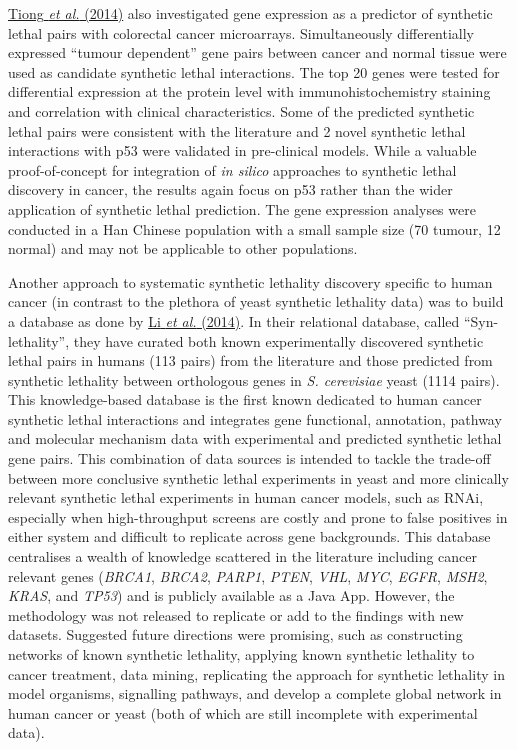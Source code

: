 \hyperlink{ENREF95}{Tiong}\hyperlink{ENREF95}{\textit{ et al.}}\hyperlink{ENREF95}{ (2014)} also investigated gene expression as a predictor of synthetic lethal pairs with colorectal cancer microarrays. Simultaneously differentially expressed {\textquotedblleft}tumour dependent{\textquotedblright} gene pairs between cancer and normal tissue were used as candidate synthetic lethal interactions. The top 20 genes were tested for differential expression at the protein level with immunohistochemistry staining and correlation with clinical characteristics. Some of the predicted synthetic lethal pairs were consistent with the literature and 2 novel synthetic lethal interactions with p53 were validated in pre-clinical models. While a valuable proof-of-concept for integration of \textit{in silico} approaches to synthetic lethal discovery in cancer, the results again focus on p53 rather than the wider application of synthetic lethal prediction. The gene expression analyses were conducted in a Han Chinese population with a small sample size (70 tumour, 12 normal) and may not be applicable to other populations.  

Another approach to systematic synthetic lethality discovery specific to human cancer (in contrast to the plethora of yeast synthetic lethality data) was to build a database as done by \hyperlink{ENREF69}{Li}\hyperlink{ENREF69}{\textit{ et al.}}\hyperlink{ENREF69}{ (2014)}. In their relational database, called {\textquotedblleft}Syn-lethality{\textquotedblright}, they have curated both known experimentally discovered synthetic lethal pairs in humans (113 pairs) from the literature and those predicted from synthetic lethality between orthologous genes in \textit{S. cerevisiae} yeast (1114 pairs). This knowledge-based database is the first known dedicated to human cancer synthetic lethal interactions and integrates gene functional, annotation, pathway and molecular mechanism data with experimental and predicted synthetic lethal gene pairs. This combination of data sources is intended to tackle the trade-off between more conclusive synthetic lethal experiments in yeast and more clinically relevant synthetic lethal experiments in human cancer models, such as RNAi, especially when high-throughput screens are costly and prone to false positives in either system and difficult to replicate across gene backgrounds. This database centralises a wealth of knowledge scattered in the literature including cancer relevant genes (\textit{BRCA1}, \textit{BRCA2}, \textit{PARP1}, \textit{PTEN}, \textit{VHL}, \textit{MYC}, \textit{EGFR}, \textit{MSH2}, \textit{KRAS}, and \textit{TP53}) and is publicly available as a Java App. However, the methodology was not released to replicate or add to the findings with new datasets. Suggested future directions were promising, such as constructing networks of known synthetic lethality, applying known synthetic lethality to cancer treatment, data mining, replicating the approach for synthetic lethality in model organisms, signalling pathways, and develop a complete global network in human cancer or yeast (both of which are still incomplete with experimental data).  

